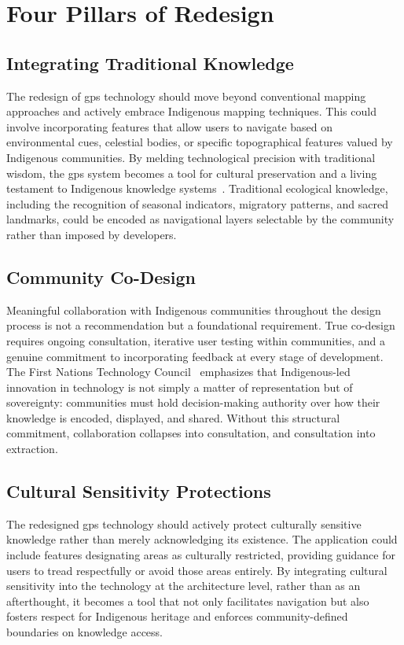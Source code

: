 \documentclass[11pt,showkeys]{essay}
\begin{document}
\section{Four Pillars of Redesign}

\subsection{Integrating Traditional Knowledge}

The redesign of \gls{gps} technology should move beyond conventional mapping approaches and actively embrace Indigenous mapping techniques. This could involve incorporating features that allow users to navigate based on environmental cues, celestial bodies, or specific topographical features valued by Indigenous communities. By melding technological precision with traditional wisdom, the \gls{gps} system becomes a tool for cultural preservation and a living testament to Indigenous knowledge systems~\cite{handayani_integrating_2023}. Traditional ecological knowledge, including the recognition of seasonal indicators, migratory patterns, and sacred landmarks, could be encoded as navigational layers selectable by the community rather than imposed by developers.

\subsection{Community Co-Design}

Meaningful collaboration with Indigenous communities throughout the design process is not a recommendation but a foundational requirement. True co-design requires ongoing consultation, iterative user testing within communities, and a genuine commitment to incorporating feedback at every stage of development. The First Nations Technology Council~\cite{firstnations_innovation_2022} emphasizes that Indigenous-led innovation in technology is not simply a matter of representation but of sovereignty: communities must hold decision-making authority over how their knowledge is encoded, displayed, and shared. Without this structural commitment, collaboration collapses into consultation, and consultation into extraction.

\subsection{Cultural Sensitivity Protections}

The redesigned \gls{gps} technology should actively protect culturally sensitive knowledge rather than merely acknowledging its existence. The application could include features designating areas as culturally restricted, providing guidance for users to tread respectfully or avoid those areas entirely. By integrating cultural sensitivity into the technology at the architecture level, rather than as an afterthought, it becomes a tool that not only facilitates navigation but also fosters respect for Indigenous heritage and enforces community-defined boundaries on knowledge access.
\end{document}
